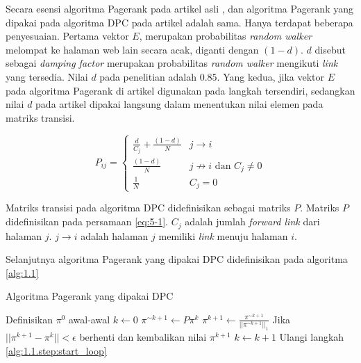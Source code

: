 Secara esensi algoritma Pagerank pada artikel asli \citet{ilprints422}, dan algoritma Pagerank yang dipakai pada algoritma DPC pada artikel \citet{zhuetal2005distributedPagerank} adalah sama. Hanya terdapat beberapa penyesuaian. Pertama vektor $E$, merupakan probabilitas \textit{random walker} melompat ke halaman web lain secara acak, diganti dengan $(1 - d)$. $d$ disebut sebagai \textit{damping factor} merupakan probabilitas \textit{random walker} mengikuti \textit{link} yang tersedia. Nilai $d$ pada penelitian \citet{zhuetal2005distributedPagerank} adalah $0.85$. Yang kedua, jika vektor $E$ pada algoritma Pagerank di artikel \citet{ilprints422} digunakan pada langkah tersendiri, sedangkan nilai $d$ pada artikel \citet{zhuetal2005distributedPagerank} dipakai langsung dalam menentukan nilai elemen pada matriks transisi.

\begin{equation}
	\label{eq:5-1}
	P_{ij}= 
	\begin{cases}
		\frac{d}{C_j} + \frac{(1-d)}{N} & j \to i \\
		\frac{(1-d)}{N} & j \not\to i \text{ dan } C_j \not=0 \\
		\frac{1}{N} & C_j = 0
	\end{cases}
\end{equation}

Matriks transisi pada algoritma DPC didefinisikan sebagai matriks $P$. Matriks $P$ didefinisikan pada persamaan \ref{eq:5-1}. $C_j$ adalah jumlah \textit{forward link} dari halaman $j$. $j \to i$ adalah halaman $j$ memiliki \textit{link} menuju halaman $i$.

Selanjutnya algoritma Pagerank yang dipakai DPC didefinisikan pada algoritma \ref{alg:1.1}

\begin{breakablealgorithm}
	\label{alg:1.1}
	\caption{Algoritma Pagerank yang dipakai DPC \citep{zhuetal2005distributedPagerank}}
	\begin{algorithmic}[1]
		\State Definisikan $\pi^0$ awal-awal
		\State $k \gets 0$
		\State \label{alg:1.1.step:start_loop} $\pi^{\sim k+1} \gets P \pi^k$
		\State $\pi^{k+1} \gets \frac{\pi^{\sim k+1}}{||\pi^{\sim k+1}||_1}$
		\State Jika $||\pi^{k+1} - \pi^k|| < \epsilon$  berhenti dan kembalikan nilai $\pi^{k+1}$
		\State $k \gets k+1$
		\State Ulangi langkah \ref{alg:1.1.step:start_loop}
	\end{algorithmic}
\end{breakablealgorithm}

